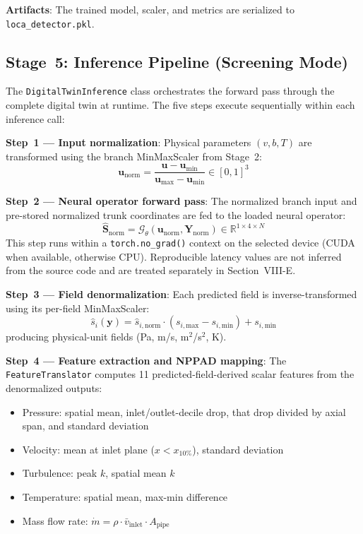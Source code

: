 \documentclass[journal]{IEEEtran}
\newcommand{\added}[1]{#1}
\begin{document}
\textbf{Artifacts}: The trained model, scaler, and metrics are serialized to \texttt{loca\_detector.pkl}.

\subsection{Stage~5: Inference Pipeline (Screening Mode)}
\label{sec:inference_pipeline}

The \texttt{DigitalTwinInference} class orchestrates the forward pass through the complete digital twin at runtime. The five steps execute sequentially within each inference call:

\textbf{Step~1 --- Input normalization}: Physical parameters $(v, b, T)$ are transformed using the branch MinMaxScaler from Stage~2:
\begin{equation}
\bm{u}_\text{norm} = \frac{\bm{u} - \bm{u}_\text{min}}{\bm{u}_\text{max} - \bm{u}_\text{min}} \in [0,1]^3
\end{equation}

\textbf{Step~2 --- Neural operator forward pass}: The normalized branch input and pre-stored normalized trunk coordinates are fed to the loaded neural operator:
\begin{equation}
\hat{\bm{S}}_\text{norm} = \mathcal{G}_\theta(\bm{u}_\text{norm}, \bm{Y}_\text{norm}) \in \mathbb{R}^{1 \times 4 \times N}
\end{equation}
\added{This step runs within a \texttt{torch.no\_grad()} context on the selected device (CUDA when available, otherwise CPU). Reproducible latency values are not inferred from the source code and are treated separately in Section~VIII-E.}

\textbf{Step~3 --- Field denormalization}: Each predicted field is inverse-transformed using its per-field MinMaxScaler:
\begin{equation}
\hat{s}_i(\bm{y}) = \hat{s}_{i,\text{norm}} \cdot (s_{i,\text{max}} - s_{i,\text{min}}) + s_{i,\text{min}}
\end{equation}
producing physical-unit fields (Pa, m/s, m$^2$/s$^2$, K).

\textbf{Step~4 --- Feature extraction and NPPAD mapping}: \added{The \texttt{FeatureTranslator} computes 11 predicted-field-derived scalar features from the denormalized outputs:}
\begin{itemize}
    \item \added{Pressure: spatial mean, inlet/outlet-decile drop, that drop divided by axial span, and standard deviation}
    \item Velocity: mean at inlet plane ($x < x_{10\%}$), standard deviation
    \item Turbulence: peak $k$, spatial mean $k$
    \item Temperature: spatial mean, max-min difference
    \item Mass flow rate: $\dot{m} = \rho \cdot \bar{v}_\text{inlet} \cdot A_\text{pipe}$
\end{itemize}
\end{document}
